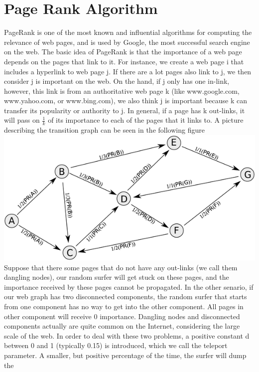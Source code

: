 \documentclass[journal]{IEEEtran}
\begin{document}
\section{Page Rank Algorithm}
PageRank is one of the most known and influential algorithms for computing the
relevance of web pages, and is used by Google, the most successful search
engine on the web. The basic idea of PageRank is that the importance of a web
page depends on the pages that link to it. For instance, we create a web page i
that includes a hyperlink to web page j. If there are a lot pages also link to
j, we then consider j is important on the web. On the hand, if j only has one
in-link, however, this link is from an authoritative web page k (like
www.google.com, www.yahoo.com, or www.bing.com), we also think j is important
because k can transfer its popularity or authority to j.
In general, if a page has k out-links, it will pass on ${\frac{1}{k}}$ of its
importance to each of the pages that it links to.
A picture describing the transition graph can be seen in the following figure\\
\includegraphics[scale=3.5]{./rappresentazione.png}\\
Suppose that there some pages that do not have any
out-links (we call them dangling nodes), our random surfer will get stuck on
these pages, and the importance received by these pages cannot be propagated.
In the other senario, if our web graph has two disconnected components, the
random surfer that starts from one component has no way to get into the other
component. All pages in other component will receive 0
importance.  Dangling nodes and disconnected components actually are quite
common on the Internet, considering the large scale of the web. In order to
deal with these two problems, a positive constant d between 0 and 1 (typically
0.15) is introduced, which we call the teleport parameter.
A smaller, but positive percentage of the time, the surfer will dump the
\end{document}
